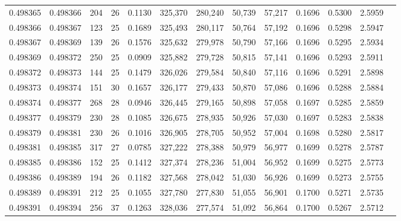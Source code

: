 \begin{tabular}{rrrrrrrrrrrrr}
0.498365 & 0.498366 & 204 &  26 &                                     0.1130 & 325,370 & 280,240 &  50,739 &  57,217 & 0.1696 & 0.5300 & 2.5959 \\
0.498366 & 0.498367 & 123 &  25 &                                     0.1689 & 325,493 & 280,117 &  50,764 &  57,192 & 0.1696 & 0.5298 & 2.5947 \\
0.498367 & 0.498369 & 139 &  26 &                                     0.1576 & 325,632 & 279,978 &  50,790 &  57,166 & 0.1696 & 0.5295 & 2.5934 \\
0.498369 & 0.498372 & 250 &  25 &                                     0.0909 & 325,882 & 279,728 &  50,815 &  57,141 & 0.1696 & 0.5293 & 2.5911 \\
0.498372 & 0.498373 & 144 &  25 &                                     0.1479 & 326,026 & 279,584 &  50,840 &  57,116 & 0.1696 & 0.5291 & 2.5898 \\
0.498373 & 0.498374 & 151 &  30 &                                     0.1657 & 326,177 & 279,433 &  50,870 &  57,086 & 0.1696 & 0.5288 & 2.5884 \\
0.498374 & 0.498377 & 268 &  28 &                                     0.0946 & 326,445 & 279,165 &  50,898 &  57,058 & 0.1697 & 0.5285 & 2.5859 \\
0.498377 & 0.498379 & 230 &  28 &                                     0.1085 & 326,675 & 278,935 &  50,926 &  57,030 & 0.1697 & 0.5283 & 2.5838 \\
0.498379 & 0.498381 & 230 &  26 &                                     0.1016 & 326,905 & 278,705 &  50,952 &  57,004 & 0.1698 & 0.5280 & 2.5817 \\
0.498381 & 0.498385 & 317 &  27 &                                     0.0785 & 327,222 & 278,388 &  50,979 &  56,977 & 0.1699 & 0.5278 & 2.5787 \\
0.498385 & 0.498386 & 152 &  25 &                                     0.1412 & 327,374 & 278,236 &  51,004 &  56,952 & 0.1699 & 0.5275 & 2.5773 \\
0.498386 & 0.498389 & 194 &  26 &                                     0.1182 & 327,568 & 278,042 &  51,030 &  56,926 & 0.1699 & 0.5273 & 2.5755 \\
0.498389 & 0.498391 & 212 &  25 &                                     0.1055 & 327,780 & 277,830 &  51,055 &  56,901 & 0.1700 & 0.5271 & 2.5735 \\
0.498391 & 0.498394 & 256 &  37 &                                     0.1263 & 328,036 & 277,574 &  51,092 &  56,864 & 0.1700 & 0.5267 & 2.5712 \\

\end{tabular}
